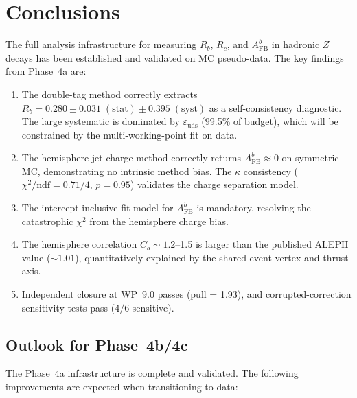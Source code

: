\documentclass[11pt,a4paper]{article}
\begin{document}
\FloatBarrier
{}
\section{Conclusions}
\label{sec:conclusions}

The full analysis infrastructure for measuring $R_b$, $R_c$, and $A_\mathrm{FB}^b$ in
hadronic $Z$ decays has been established and validated on MC pseudo-data. The key
findings from Phase~4a are:

\begin{enumerate}
\item The double-tag method correctly extracts $R_b = 0.280 \pm 0.031\;\mathrm{(stat)}
\pm 0.395\;\mathrm{(syst)}$ as a self-consistency diagnostic. The large systematic
is dominated by $\varepsilon_\mathrm{uds}$ (99.5\% of budget), which will be constrained
by the multi-working-point fit on data.

\item The hemisphere jet charge method correctly returns $A_\mathrm{FB}^b \approx 0$
on symmetric MC, demonstrating no intrinsic method bias. The $\kappa$ consistency
($\chi^2/\mathrm{ndf} = 0.71/4$, $p = 0.95$) validates the charge separation model.

\item The intercept-inclusive fit model for $A_\mathrm{FB}^b$ is mandatory, resolving
the catastrophic $\chi^2$ from the hemisphere charge bias.

\item The hemisphere correlation $C_b \sim 1.2$--1.5 is larger than the published
ALEPH value ($\sim 1.01$), quantitatively explained by the shared event vertex
and thrust axis.

\item Independent closure at WP~9.0 passes (pull = 1.93), and corrupted-correction
sensitivity tests pass (4/6 sensitive).
\end{enumerate}

\subsection{Outlook for Phase~4b/4c}
\label{sec:outlook}

The Phase~4a infrastructure is complete and validated. The following improvements are
expected when transitioning to data:
\end{document}
